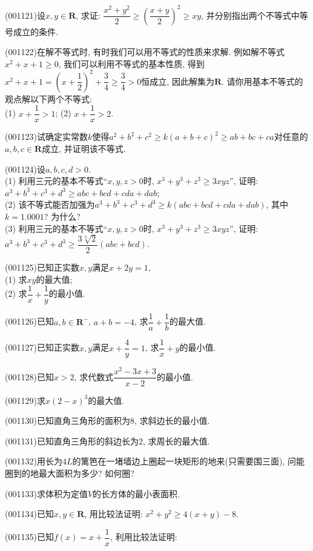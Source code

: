 \item (001121)设$x,y\in \mathbf{R}$, 求证:  $\dfrac{x^2+y^2}{2}\ge(\dfrac{x+y}{2})^2\ge xy$, 并分别指出两个不等式中等号成立的条件.
\item (001122)在解不等式时, 有时我们可以用不等式的性质来求解. 例如解不等式$x^2+x+1\ge 0$, 我们可以利用不等式的基本性质, 得到$x^2+x+1=\left(x+\dfrac{1}{2}\right)^2+\dfrac{3}{4}\ge\dfrac{3}{4}>0$恒成立, 因此解集为$\mathbf{R}$. 请你用基本不等式的观点解以下两个不等式:\\ 
(1) $x+\dfrac{1}{x}>1$; \hfill (2) $x+\dfrac{1}{x}>2$. \hfill
\item (001123)试确定实常数$k$使得$a^2+b^2+c^2\geq k(a+b+c)^2\geq ab+bc+ca$对任意的$a,b,c\in \mathbf{R}$成立, 并证明该不等式.
\item (001124)设$a,b,c,d>0$.\\ 
(1) 利用三元的基本不等式``$x,y,z>0$时, $x^3+y^3+z^3\ge 3xyz$'', 证明: $a^3+b^3+c^3+d^3\geq abc+bcd+cda+dab$;\\ 
(2) 该不等式能否加强为$a^3+b^3+c^3+d^3\ge k(abc+bcd+cda+dab)$, 其中$k=1.0001$? 为什么?\\ 
(3) 利用三元的基本不等式``$x,y,z>0$时, $x^3+y^3+z^3\ge 3xyz$'', 证明: $a^3+b^3+c^3+d^3\geq \dfrac{3\sqrt[3]{2}}{2}(abc+bcd)$.
\item (001125)已知正实数$x,y$满足$x+2y=1$,\\ 
(1) 求$xy$的最大值;\\ 
(2) 求$\dfrac{1}{x}+\dfrac{1}{y}$的最小值.
\item (001126)已知$a,b\in \mathbf{R}^-$, $a+b=-4$, 求$\dfrac{1}{a}+\dfrac{1}{b}$的最大值.
\item (001127)已知正实数$x,y$满足$x+\dfrac{4}{y}=1$, 求$\dfrac{1}{x}+y$的最小值.
\item (001128)已知$x>2$, 求代数式$\dfrac{x^2-3x+3}{x-2}$的最小值.
\item (001129)求$x(2-x)^3$的最大值.
\item (001130)已知直角三角形的面积为$8$, 求斜边长的最小值.
\item (001131)已知直角三角形的斜边长为$2$, 求周长的最大值.
\item (001132)用长为$4L$的篱笆在一堵墙边上圈起一块矩形的地来(只需要围三面), 问能圈到的地最大面积为多少? 如何圈?
\item (001133)求体积为定值$V$的长方体的最小表面积.
\item (001134)已知$x,y \in \mathbf{R}$, 用比较法证明: $x^2+y^2\ge 4(x+y)-8$.
\item (001135)已知$f(x)=x+\dfrac{1}{x}$, 利用比较法证明:\\ 
